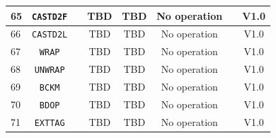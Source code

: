 \documentclass{article}
\begin{document}
\begin{longtable}{|l|c|c|c|c|c|c|c|}
		65 & \texttt{CASTD2F} & & TBD & TBD & No operation & & \textsf{V1.0} \\ \hline
		66 & \texttt{CASTD2L} & & TBD & TBD & No operation & & \textsf{V1.0} \\ \hline
		67 & \texttt{WRAP} & & TBD & TBD & No operation & & \textsf{V1.0} \\ \hline
		68 & \texttt{UNWRAP} & & TBD & TBD & No operation & & \textsf{V1.0} \\ \hline
		69 & \texttt{BCKM} & & TBD & TBD & No operation & & \textsf{V1.0} \\ \hline
		70 & \texttt{BDOP} & & TBD & TBD & No operation & & \textsf{V1.0} \\ \hline
		71 & \texttt{EXTTAG} & & TBD & TBD & No operation & & \textsf{V1.0} \\ \hline

\end{longtable}
\end{document}
